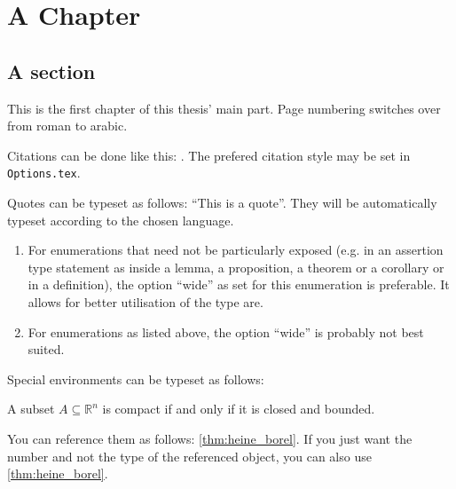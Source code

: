 \chapter{A Chapter}
\section{A section}

This is the first chapter of this thesis' main part. Page numbering switches over from roman to arabic. 

Citations can be done like this: \cite{Amann2008AnalysisII}. The prefered citation style may be set in \texttt{Options.tex}.

Quotes can be typeset as follows: \enquote{This is a quote}. They will be automatically typeset according to the chosen language.

\begin{enumerate}[wide]
	\item For enumerations that need not be particularly exposed (e.g. in an assertion type statement as inside a lemma, a proposition, a theorem or a corollary or in a definition), the option \enquote{wide} as set for
	this enumeration is preferable. It allows for better utilisation of the type are.
	\item For enumerations as listed above, the option \enquote{wide} is probably not best suited.
\end{enumerate}

Special environments can be typeset as follows:

\begin{Theorem}
\label{thm:heine_borel}
	A subset $A\subseteq \mathds{R}^n$ is compact if and only if it is closed and bounded. 
\end{Theorem}
You can reference them as follows: \cref{thm:heine_borel}. If you just want the number and not the type of the referenced object, you can also use \ref{thm:heine_borel}.
